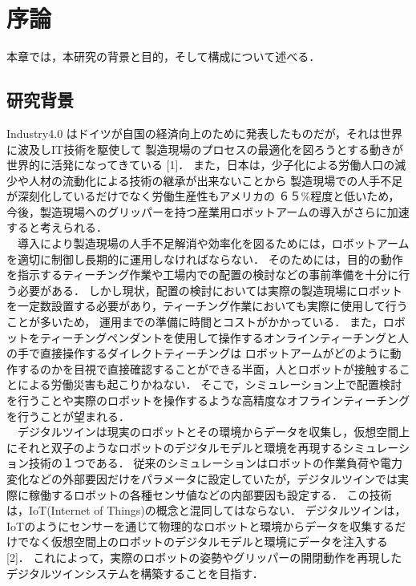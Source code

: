 \chapter{%
序論}

本章では，本研究の背景と目的，そして構成について述べる．


\section{研究背景}
Industry4.0 はドイツが自国の経済向上のために発表したものだが，それは世界に波及しIT技術を駆使して
製造現場のプロセスの最適化を図ろうとする動きが世界的に活発になってきている [1]．
また，日本は，少子化による労働人口の減少や人材の流動化による技術の継承が出来ないことから
製造現場での人手不足が深刻化しているだけでなく労働生産性もアメリカの ６５\%程度と低いため，
今後，製造現場へのグリッパーを持つ産業用ロボットアームの導入がさらに加速すると考えられる．\\
　導入により製造現場の人手不足解消や効率化を図るためには，ロボットアームを適切に制御し長期的に運用しなければならない．
そのためには，目的の動作を指示するティーチング作業や工場内での配置の検討などの事前準備を十分に行う必要がある．
しかし現状，配置の検討においては実際の製造現場にロボットを一定数設置する必要があり，ティーチング作業においても実際に使用して行うことが多いため，
運用までの準備に時間とコストがかかっている．
また，ロボットをティーチングペンダントを使用して操作するオンラインティーチングと人の手で直接操作するダイレクトティーチングは
ロボットアームがどのように動作するのかを目視で直接確認することができる半面，人とロボットが接触することによる労働災害も起こりかねない．
そこで，シミュレーション上で配置検討を行うことや実際のロボットを操作するような高精度なオフラインティーチングを行うことが望まれる．\\
　デジタルツインは現実のロボットとその環境からデータを収集し，仮想空間上にそれと双子のようなロボットのデジタルモデルと環境を再現するシミュレーション技術の１つである．
従来のシミュレーションはロボットの作業負荷や電力変化などの外部要因だけをパラメータに設定していたが，デジタルツインでは実際に稼働するロボットの各種センサ値などの内部要因も設定する．
この技術は，IoT(Internet of Things)の概念と混同してはならない．
デジタルツインは，IoTのようにセンサーを通じて物理的なロボットと環境からデータを収集するだけでなく仮想空間上のロボットのデジタルモデルと環境にデータを注入する[2]．
これによって，実際のロボットの姿勢やグリッパーの開閉動作を再現したデジタルツインシステムを構築することを目指す．


